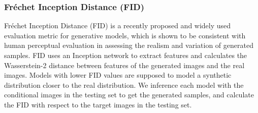 \subsubsection{Fr\'echet Inception Distance (FID)}
Fr\'echet Inception Distance (FID) \cite{FID} is a recently proposed and widely used evaluation metric for generative models, which is shown to be consistent with human perceptual evaluation in assessing the realism and variation of generated samples. FID uses an Inception network to extract features and calculates the Wasserstein-2 distance between features of the generated images and the real images. Models with lower FID values are supposed to model a synthetic distribution closer to the real distribution. We inference each model with the conditional images in the testing set to get the generated samples, and calculate the FID with respect to the target images in the testing set.
%
%
